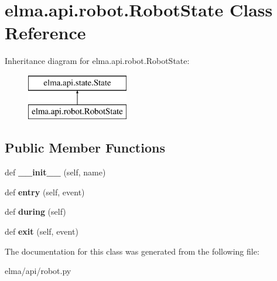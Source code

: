\hypertarget{classelma_1_1api_1_1robot_1_1RobotState}{}\section{elma.\+api.\+robot.\+Robot\+State Class Reference}
\label{classelma_1_1api_1_1robot_1_1RobotState}
Inheritance diagram for elma.\+api.\+robot.\+Robot\+State\+:\begin{figure}[H]
\begin{center}
\leavevmode
\includegraphics[height=2.000000cm]{classelma_1_1api_1_1robot_1_1RobotState}
\end{center}
\end{figure}
\subsection*{Public Member Functions}
\begin{DoxyCompactItemize}
\item 
\mbox{\label{classelma_1_1api_1_1robot_1_1RobotState_a1499921c2c3d6b51569be5cfbcad1085}} 
def {\bfseries \+\_\+\+\_\+init\+\_\+\+\_\+} (self, name)
\item 
\mbox{\label{classelma_1_1api_1_1robot_1_1RobotState_a13a44c6ec8836f2235982916b615c977}} 
def {\bfseries entry} (self, event)
\item 
\mbox{\label{classelma_1_1api_1_1robot_1_1RobotState_afc16183bb851de813f3269937c2360a6}} 
def {\bfseries during} (self)
\item 
\mbox{\label{classelma_1_1api_1_1robot_1_1RobotState_aa9054b608060dd161e4a18f194f62689}} 
def {\bfseries exit} (self, event)
\end{DoxyCompactItemize}


The documentation for this class was generated from the following file\+:\begin{DoxyCompactItemize}
\item 
elma/api/robot.\+py\end{DoxyCompactItemize}
